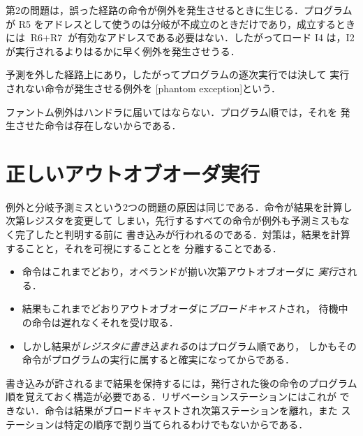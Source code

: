 \documentclass[../main.tex]{subfiles}
\begin{document}
第2の問題は，誤った経路の命令が例外を発生させるときに生じる．プログラムが
R5 をアドレスとして使うのは分岐が不成立のときだけであり，成立するときには
$\text{R6}+\text{R7}$ が有効なアドレスである必要はない．したがってロード
I4 は，I2 が実行されるよりはるかに早く例外を発生させうる．

\begin{definition}[ファントム例外]
  \label{def:l08-phantom}
  予測を外した経路上にあり，したがってプログラムの逐次実行では決して
  実行されない命令が発生させる例外を
  [phantom exception]という．
\end{definition}

ファントム例外はハンドラに届いてはならない．プログラム順では，それを
発生させた命令は存在しないからである．

\section{正しいアウトオブオーダ実行}
\label{sec:l08-correct}

例外と分岐予測ミスという2つの問題の原因は同じである．命令が結果を計算し次第レジスタを変更して
しまい，先行するすべての命令が例外も予測ミスもなく完了したと判明する前に
書き込みが行われるのである．対策は，結果を計算することと，それを可視にすることとを
分離することである．
\begin{itemize}
  \item 命令はこれまでどおり，オペランドが揃い次第アウトオブオーダに
    \emph{実行}される．
  \item 結果もこれまでどおりアウトオブオーダに\emph{ブロードキャスト}され，
    待機中の命令は遅れなくそれを受け取る．
  \item しかし結果が\emph{レジスタに書き込まれる}のはプログラム順であり，
    しかもその命令がプログラムの実行に属すると確実になってからである．
\end{itemize}
書き込みが許されるまで結果を保持するには，発行された後の命令のプログラム
順を覚えておく構造が必要である．リザベーションステーションにはこれが
できない．命令は結果がブロードキャストされ次第ステーションを離れ，また
ステーションは特定の順序で割り当てられるわけでもないからである．%
\end{document}
